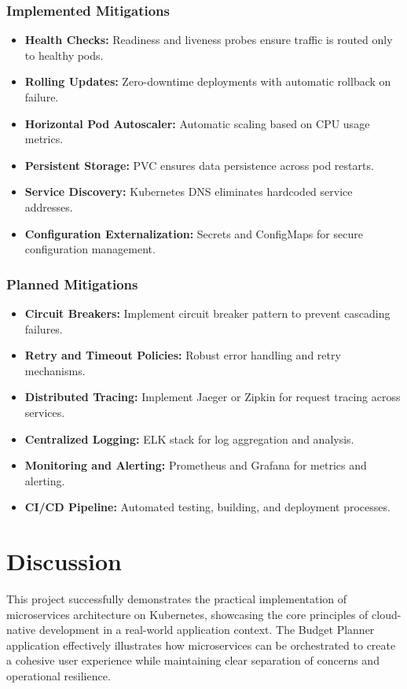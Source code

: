 \documentclass[conference]{IEEEtran}
\begin{document}
\subsubsection{Implemented Mitigations}
\begin{itemize}
  \item \textbf{Health Checks:} Readiness and liveness probes ensure traffic is routed only to healthy pods.
  \item \textbf{Rolling Updates:} Zero-downtime deployments with automatic rollback on failure.
  \item \textbf{Horizontal Pod Autoscaler:} Automatic scaling based on CPU usage metrics.
  \item \textbf{Persistent Storage:} PVC ensures data persistence across pod restarts.
  \item \textbf{Service Discovery:} Kubernetes DNS eliminates hardcoded service addresses.
  \item \textbf{Configuration Externalization:} Secrets and ConfigMaps for secure configuration management.
\end{itemize}

\subsubsection{Planned Mitigations}
\begin{itemize}
  \item \textbf{Circuit Breakers:} Implement circuit breaker pattern to prevent cascading failures.
  \item \textbf{Retry and Timeout Policies:} Robust error handling and retry mechanisms.
  \item \textbf{Distributed Tracing:} Implement Jaeger or Zipkin for request tracing across services.
  \item \textbf{Centralized Logging:} ELK stack for log aggregation and analysis.
  \item \textbf{Monitoring and Alerting:} Prometheus and Grafana for metrics and alerting.
  \item \textbf{CI/CD Pipeline:} Automated testing, building, and deployment processes.
\end{itemize}

\section{\textbf{Discussion}}
This project successfully demonstrates the practical implementation of microservices architecture on Kubernetes, showcasing the core principles of cloud-native development in a real-world application context. The Budget Planner application effectively illustrates how microservices can be orchestrated to create a cohesive user experience while maintaining clear separation of concerns and operational resilience.
\end{document}
